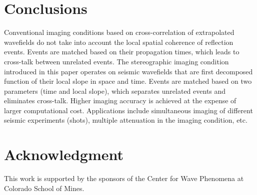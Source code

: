 \section{Conclusions}
Conventional imaging conditions based on cross-correlation of
extrapolated wavefields do not take into account the local spatial
coherence of reflection events. Events are matched based on their
propagation times, which leads to cross-talk between unrelated
events. The stereographic imaging condition introduced in this paper
operates on seismic wavefields that are first decomposed function of
their local slope in space and time. Events are matched based on two
parameters (time and local slope), which separates unrelated events
and eliminates cross-talk. Higher imaging accuracy is achieved at the
expense of larger computational cost. Applications include
simultaneous imaging of different seismic experiments (shots),
multiple attenuation in the imaging condition, etc.

\section{Acknowledgment}
This work is supported by the sponsors of the Center for Wave
Phenomena at Colorado School of Mines.




